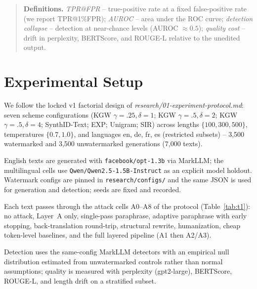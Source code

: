 \documentclass[10pt,letterpaper]{article}
\begin{document}
\begin{quote}
\textbf{Definitions.} \emph{TPR@FPR} -- true-positive rate at a fixed
false-positive rate (we report TPR@1\%FPR); \emph{AUROC} -- area
under the ROC curve; \emph{detection collapse} -- detection at
near-chance levels (AUROC $\approx 0.5$); \emph{quality cost} --
drift in perplexity, BERTScore, and ROUGE-L relative to the unedited
output. %
\end{quote}

\section{Experimental Setup}
We follow the locked v1 factorial design of
\emph{research/01-experiment-protocol.md}: seven scheme configurations
(KGW $\gamma{=}.25,\delta{=}1$; KGW $\gamma{=}.5,\delta{=}2$; KGW
$\gamma{=}.5,\delta{=}4$; SynthID-Text; EXP; Unigram; SIR) across
lengths $\{100,300,500\}$, temperatures $\{0.7,1.0\}$, and
languages en, de, fr, es (restricted subsets) -- 3,500 watermarked and
3,500 unwatermarked generations (7,000 texts).

English texts are generated with \texttt{facebook/opt-1.3b} via
MarkLLM; the multilingual cells use \texttt{Qwen/Qwen2.5-1.5B-Instruct}
as an explicit model holdout. Watermark configs are pinned in
\texttt{research/configs/} and the same JSON is used for generation
and detection; seeds are fixed and recorded.

Each text passes through the attack cells A0--A8 of the protocol
(Table~\ref{tab:t1}): no attack, Layer~A only, single-pass paraphrase,
adaptive paraphrase with early stopping, back-translation round-trip,
structural rewrite, humanization, cheap token-level baselines, and the
full layered pipeline (A1 then A2/A3).

Detection uses the same-config MarkLLM detectors with an empirical null
distribution estimated from unwatermarked controls rather than normal
assumptions; quality is measured with perplexity (gpt2-large),
BERTScore, ROUGE-L, and length drift on a stratified subset.
\end{document}
